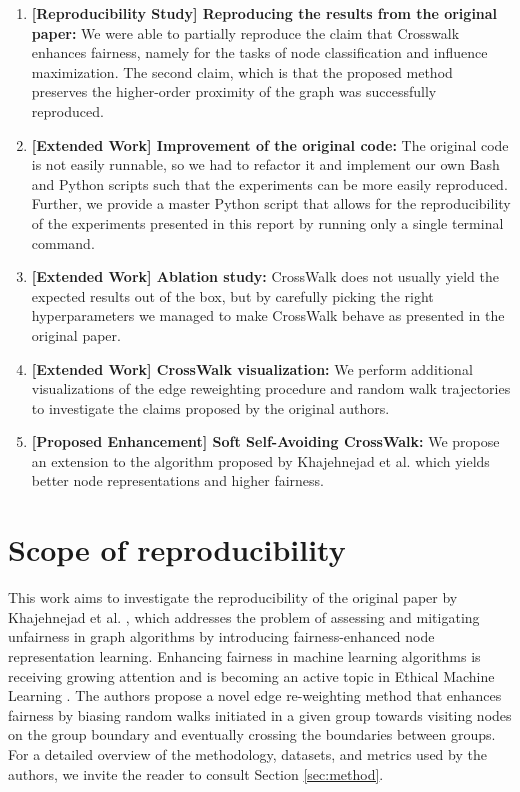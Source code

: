 \begin{enumerate}
    \item \textbf{[Reproducibility Study] Reproducing the results from the original paper:} We were able to partially reproduce the claim that Crosswalk enhances fairness, namely for the tasks of node classification and influence maximization. The second claim, which is that the proposed method preserves the higher-order proximity of the graph was successfully reproduced.
    \item \textbf{[Extended Work] Improvement of the original code:} The original code is not easily runnable, so we had to refactor it and implement our own Bash and Python scripts such that the experiments can be more easily reproduced. Further, we provide a master Python script that allows for the reproducibility of the experiments presented in this report by running only a single terminal command.
    \item \textbf{[Extended Work] Ablation study:} CrossWalk does not usually yield the expected results out of the box, but by carefully picking the right hyperparameters we managed to make CrossWalk behave as presented in the original paper.
    \item \textbf{[Extended Work] CrossWalk visualization:} We perform additional visualizations of the edge reweighting procedure and random walk trajectories to investigate the claims proposed by the original authors. 
    \item \textbf{[Proposed Enhancement] Soft Self-Avoiding CrossWalk:} We propose an extension to the algorithm proposed by Khajehnejad et al. \cite{crosswalk} which yields better node representations and higher fairness.
\end{enumerate}

\section{Scope of reproducibility}
\label{sec:claims}
This work aims to investigate the reproducibility of the original paper by Khajehnejad et al. \cite{crosswalk}, which addresses the problem of assessing and mitigating unfairness in graph algorithms by introducing fairness-enhanced node representation learning. Enhancing fairness in machine learning algorithms is receiving growing attention and is becoming an active topic in Ethical Machine Learning \cite{DBLP:journals/corr/abs-2201-06921} \cite{DBLP:journals/corr/abs-2009-10576}. The authors propose a novel edge re-weighting method that enhances fairness by biasing random walks initiated in a given group towards visiting nodes on the group boundary and eventually crossing the boundaries between groups. For a detailed overview of the methodology, datasets, and metrics used by the authors, we invite the reader to consult Section \ref{sec:method}. \\

